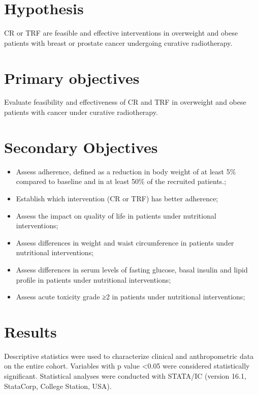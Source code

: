 \documentclass[journal,article,submit,pdftex,moreauthors]{Definitions/mdpi}
\begin{document}
\section{Hypothesis}

CR or TRF are feasible and effective interventions in overweight and obese patients with breast or prostate cancer undergoing curative radiotherapy.\\
\section{Primary objectives}

Evaluate feasibility and effectiveness of CR and TRF in overweight and obese patients with cancer under curative radiotherapy.\\
\section{Secondary Objectives}

\begin{itemize}
\item	Assess adherence, defined as a reduction in body weight of at least 5\% compared to baseline and in at least 50\% of the recruited patients.;
\item	Establish which intervention (CR or TRF) has better adherence;
\item	Assess the impact on quality of life in patients under nutritional interventions;
\item	Assess differences in weight and waist circumference in patients under nutritional interventions;
\item	Assess differences in serum levels of fasting glucose, basal insulin and lipid profile in patients under nutritional interventions;
\item	Assess acute toxicity grade ≥2 in patients under nutritional interventions;
\end{itemize}

\section{Results}

Descriptive statistics were used to characterize clinical and anthropometric data on the entire cohort. Variables with p value <0.05 were considered statistically significant. Statistical analyses were conducted with STATA/IC (version 16.1, StataCorp, College Station, USA).\\
\end{document}
